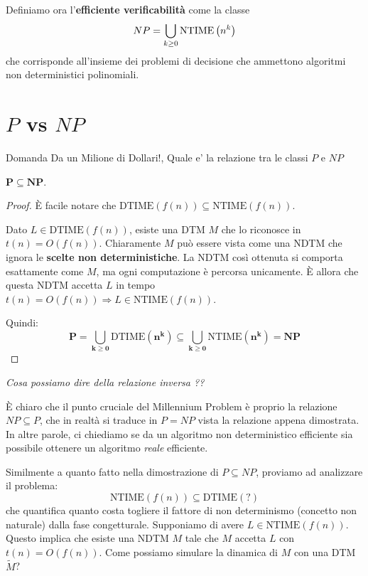 Definiamo ora l'\textbf{efficiente verificabilità} come la classe
$$ NP = \bigcup_{k \geq 0} \text{NTIME} \left(n^k\right) $$
che corrisponde all'insieme dei problemi di decisione che ammettono algoritmi non deterministici polinomiali.

\section{$P$ vs $NP$}

Domanda Da un Milione di Dollari!, Quale e' la relazione tra le classi $P$ e $NP$ \\

\begin{theor}
$\mathbf{P \subseteq NP}$.
\end{theor}

\begin{proof}
È facile notare che $\mathrm{DTIME}(f(n)) \subseteq \mathrm{NTIME}(f(n))$.

Dato $L \in \mathrm{DTIME}(f(n))$, esiste una DTM $M$ che lo riconosce in $t(n) = O(f(n))$. Chiaramente $M$ può essere vista come una NDTM che ignora le \textbf{scelte non deterministiche}. La NDTM così ottenuta si comporta esattamente come $M$, ma ogni computazione è percorsa unicamente. È allora che questa NDTM accetta $L$ in tempo $t(n) = O(f(n)) \Rightarrow L \in \mathrm{NTIME}(f(n))$.

Quindi:
\[
\mathbf{P = \bigcup_{k \geq 0} \mathrm{DTIME}(n^k) \subseteq \bigcup_{k \geq 0} \mathrm{NTIME}(n^k) = NP}
\]
\end{proof}

\textit{Cosa possiamo dire della relazione inversa ??}

È chiaro che il punto cruciale del Millennium Problem è proprio la relazione $NP \subseteq P$, che in realtà si traduce in $P = NP$ vista la relazione appena dimostrata. In altre parole, ci chiediamo se da un algoritmo non deterministico efficiente sia possibile ottenere un algoritmo \emph{reale} efficiente.

Similmente a quanto fatto nella dimostrazione di $P \subseteq NP$, proviamo ad analizzare il problema:
\[
\text{NTIME}(f(n)) \subseteq \text{DTIME}(?)
\]
che quantifica quanto costa togliere il fattore di non determinismo (concetto non naturale) dalla fase congetturale. Supponiamo di avere $L \in \text{NTIME}(f(n))$. Questo implica che esiste una NDTM $M$ tale che $M$ accetta $L$ con $t(n) = O(f(n))$. Come possiamo simulare la dinamica di $M$ con una DTM $\widetilde{M}$?

